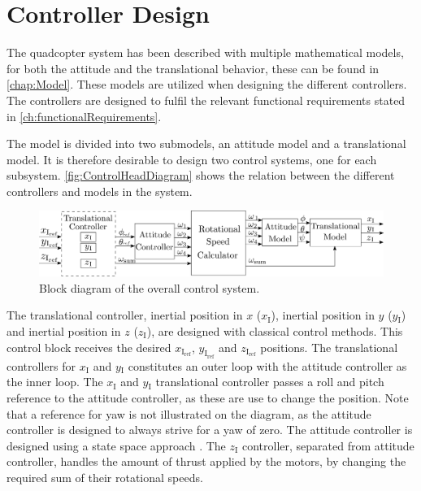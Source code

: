 \chapter{Controller Design}\label{chap:Control}
The quadcopter system has been described with multiple mathematical models, for both the attitude and the translational behavior, these can be found in \autoref{chap:Model}. These models are utilized when designing the different controllers. The controllers are designed to fulfil the relevant functional requirements stated in \autoref{ch:functionalRequirements}.

The model is divided into two submodels, an attitude model and a translational model. It is therefore desirable to design two control systems, one for each subsystem. \autoref{fig:ControlHeadDiagram} shows the relation between the different controllers and models in the system.

%
\begin{figure}[H]
	\centering
	\includegraphics[width=1 \textwidth]{figures/generalcontroldiagram2}
	\caption{Block diagram of the overall control system.}
	\label{fig:ControlHeadDiagram}
\end{figure}
%
The translational controller, inertial position in $x$ ($x\mathrm{_I}$), inertial position in $y$ ($y\mathrm{_I}$) and inertial position in $z$ ($z\mathrm{_I}$), are designed with classical control methods. This control block receives the desired $x_\mathrm{I_{ref}}$, $y_\mathrm{I_{ref}}$ and $z_\mathrm{I_{ref}}$ positions. The translational controllers for $x\mathrm{_I}$ and $y\mathrm{_I}$ constitutes an outer loop with the attitude controller as the inner loop. The $x\mathrm{_I}$ and $y\mathrm{_I}$ translational controller passes a roll and pitch reference to the attitude controller, as these are use to change the position. Note that a reference for yaw is not illustrated on the diagram, as the attitude controller is designed to always strive for a yaw of zero. The attitude controller is designed using a state space approach \cite{ssReference}. The $z\mathrm{_I}$ controller, separated from attitude controller, handles the amount of thrust applied by the motors, by changing the required sum of their rotational speeds.

